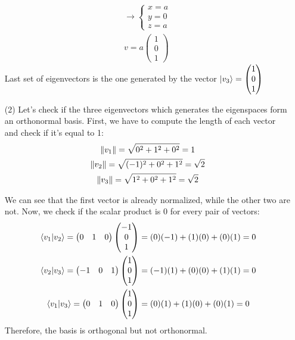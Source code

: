 \documentclass[12pt]{article}
\begin{document}
\begin{enumerate}
\begin{gather*}
\longrightarrow
\begin{cases}
    x=a\\
    y=0\\
    z=a
\end{cases}\\
v=
a
\begin{pmatrix}
    1\\0\\1
\end{pmatrix}
\end{gather*}
Last set of eigenvectors is the one generated by the vector
$
\ket{v_3} = 
\begin{pmatrix}
    1 \\
    0 \\
    1
\end{pmatrix}
$

\item[(2)]
Let's check if the three eigenvectors which generates the eigenspaces form an orthonormal basis.
First, we have to compute the length of each vector and check if it's equal to 1:
\begin{gather*}
    \norm{v_1} = \sqrt{0^2 + 1^2 + 0^2} = 1\\
    \norm{v_2} = \sqrt{(-1)^2 + 0^2 + 1^2} = \sqrt{2} \\
    \norm{v_3} = \sqrt{1^2 + 0^2 + 1^2} = \sqrt{2}
\end{gather*}

We can see that the first vector is already normalized, while the other two are not.
Now, we check if the scalar product is 0 for every pair of vectors:
\begin{gather*}
    \braket*{v_1}{v_2} = 
    \begin{pmatrix}
        0 & 1 & 0
    \end{pmatrix}
    \begin{pmatrix}
        -1 \\ 0 \\ 1
    \end{pmatrix}
    = (0)(-1) + (1)(0) + (0)(1) = 0 \\
    \braket*{v_2}{v_3} = 
    \begin{pmatrix}
        -1 & 0 & 1
    \end{pmatrix}
    \begin{pmatrix}
        1 \\ 0 \\ 1
    \end{pmatrix}
    = (-1)(1) + (0)(0) + (1)(1) = 0 \\
    \braket*{v_1}{v_3}  = 
    \begin{pmatrix}
        0 & 1 & 0
    \end{pmatrix}
    \begin{pmatrix}
        1 \\ 0 \\ 1
    \end{pmatrix}
    = (0)(1) + (1)(0) + (0)(1) = 0
\end{gather*}
Therefore, the basis is orthogonal but not orthonormal.


\end{enumerate}
\end{document}
